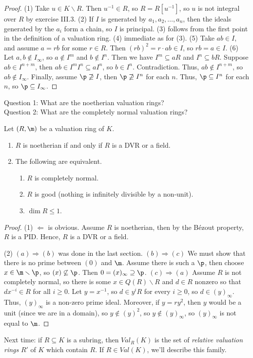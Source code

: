 \begin{proof}
  (1) Take $u\in K\smallsetminus R$. Then $u^{-1}\in R$, so $R=R[u^{-1}]$, so $u$ is not
  integral over $R$ by exercise III.3. (2) If $I$ is generated by $a_1, a_2, \dots, a_n$,
  then the ideals generated by the $a_i$ form a chain, so $I$ is principal. (3) follows
  from the first point in the definition of a valuation ring. (4) immediate
  as for (3). (5) Take $ab\in I$, and assume $a=rb$ for some $r\in R$. Then $(rb)^2=
  r\cdot ab\in I$, so $rb=a\in I$. (6) Let $a,b\not\in I_\infty$, so $a\not\in I^m$ and
  $b\not\in I^n$. Then  we have $I^m\subseteq aR$ and $I^n\subseteq bR$. Suppose $ab\in
  I^{n+m}$, then $ab\in I^m I^n\subseteq aI^n$, so $b\in I^n$. Contradiction. Thus,
  $ab\not\in I^{n+m}$, so $ab\not\in I_\infty$. Finally, assume $\p\not\supseteq I$, then
  $\p\not\supseteq I^n$ for each $n$. Thus, $\p\subseteq I^n$ for each $n$, so
  $\p\subseteq I_\infty$.
\end{proof}
\noindent
Question 1: What are the noetherian valuation rings?\\
Question 2: What are the completely normal valuation rings?\\
\begin{corollary}
  Let $(R,\m)$ be a valuation ring of $K$.
  \begin{enumerate}
    \item $R$ is noetherian if and only if $R$ is a DVR or a field.
    \item The following are equivalent.
    \begin{enumerate}
      \item $R$ is completely normal.
      \item $R$ is good (nothing is infinitely divisible by a non-unit).
      \item $\dim R\le 1$.
    \end{enumerate}
  \end{enumerate}
\end{corollary}
\begin{proof}
  (1) $\Leftarrow$ is obvious. Assume $R$ is noetherian, then by the B\'ezout property,
  $R$ is a PID. Hence, $R$ is a DVR or a field.

  (2) $(a)\Rightarrow(b)$ was done in the last section. $(b)\Rightarrow(c)$ We must show
  that there is no prime between $(0)$ and $\m$. Assume there is such a $\p$, then choose
  $x\in \m\smallsetminus \p$, so $(x)\not\subseteq \p$. Then $0=(x)_\infty\supseteq \p$.
  $(c)\Rightarrow(a)$ Assume $R$ is not completely normal, so there is some $x\in
  Q(R)\smallsetminus R$ and $d\in R$ nonzero so that $dx^{-i}\in R$ for all $i\ge 0$. Let
  $y=x^{-1}$, so $d\in y^i R$ for every $i\ge 0$, so $d\in (y)_\infty$. Thus,
  $(y)_\infty$ is a non-zero prime ideal. Moreover, if $y=ry^2$, then $y$ would be a unit
  (since we are in a domain), so $y\not\in (y)^2$, so $y\not\in (y)_\infty$, so
  $(y)_\infty$ is not equal to $\m$.
\end{proof}
Next time: if $R\subseteq K$ is a subring, then $Val_R(K)$ is the set of \emph{relative
valuation rings} $R'$ of $K$ which contain $R$. If $R\in Val(K)$, we'll describe this
family.

